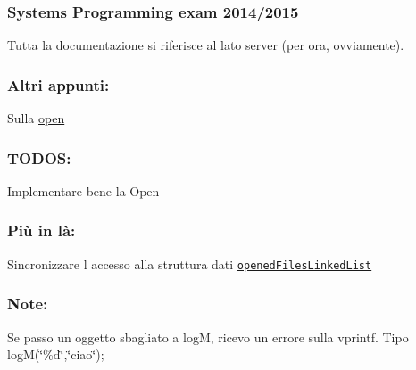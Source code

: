 \subsubsection*{Systems Programming exam 2014/2015}

Tutta la documentazione si riferisce al lato server (per ora, ovviamente). \subsubsection*{Altri appunti\+:}


\begin{DoxyItemize}
\item Sulla \hyperlink{md_OPE}{open}
\end{DoxyItemize}

\subsubsection*{T\+O\+D\+O\+S\+:}


\begin{DoxyItemize}
\item Implementare bene la Open
\end{DoxyItemize}

\subsubsection*{Più in là\+:}


\begin{DoxyItemize}
\item Sincronizzare l\textquotesingle{} accesso alla struttura dati \href{file:///home/federicoponzi/Progetto/html/server_8c.html#a3063a74baee4fe1870e52d0ec577afa9}{\tt opened\+Files\+Linked\+List}
\end{DoxyItemize}

\subsubsection*{Note\+:}


\begin{DoxyItemize}
\item Se passo un oggetto sbagliato a log\+M, ricevo un errore sulla vprintf. Tipo log\+M(\char`\"{}\%d\char`\"{},\char`\"{}ciao\char`\"{}); 
\end{DoxyItemize}
